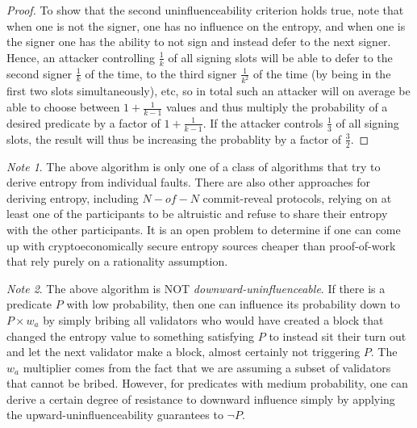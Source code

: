 \documentclass[11pt,a4paper]{report}
\theoremstyle{plain}
\theoremstyle{definition}
\theoremstyle{remark}
\newtheorem*{note}{Note}
\begin{document}
\begin{proof}
To show that the second uninfluenceability criterion holds true, note that when one is not the signer, one has no influence on the entropy, and when one is the signer one has the ability to not sign and instead defer to the next signer. Hence, an attacker controlling $\frac{1}{k}$ of all signing slots will be able to defer to the second signer $\frac{1}{k}$ of the time, to the third signer $\frac{1}{k^2}$ of the time (by being in the first two slots simultaneously), etc, so in total such an attacker will on average be able to choose between $1 + \frac{1}{k-1}$ values and thus multiply the probability of a desired predicate by a factor of $1 + \frac{1}{k-1}$. If the attacker controls $\frac{1}{3}$ of all signing slots, the result will thus be increasing the probablity by a factor of $\frac{3}{2}$.
\end{proof}

\begin{note}
The above algorithm is only one of a class of algorithms that try to derive entropy from individual faults. There are also other approaches for deriving entropy, including $N-of-N$ commit-reveal protocols, relying on at least one of the participants to be altruistic and refuse to share their entropy with the other participants. It is an open problem to determine if one can come up with cryptoeconomically secure entropy sources cheaper than proof-of-work that rely purely on a rationality assumption.
\end{note}

\begin{note}
The above algorithm is NOT \emph{downward-uninfluenceable}. If there is a predicate $P$ with low probability, then one can influence its probability down to $P \times  w_a$ by simply bribing all validators who would have created a block that changed the entropy value to something satisfying $P$ to instead sit their turn out and let the next validator make a block, almost certainly not triggering $P$. The $w_a$ multiplier comes from the fact that we are assuming a subset of validators that cannot be bribed. However, for predicates with medium probability, one can derive a certain degree of resistance to downward influence simply by applying the upward-uninfluenceability guarantees to $\neg P$.
\end{note}
\end{document}
